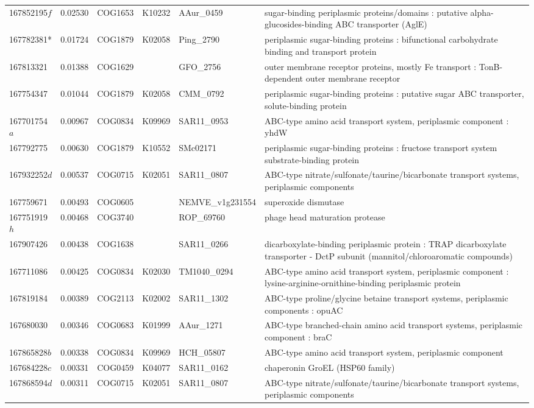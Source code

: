 \begin{landscape}
\begin{longtable}{p{1.6cm}p{1.2cm}p{1.5cm}p{1.5cm}p{2.8cm}p{13.5cm}}
167852195$f$&0.02530&COG1653&K10232&AAur\_0459&sugar-binding periplasmic proteins/domains : putative alpha-glucosides-binding ABC transporter (AglE) \\
167782381*&0.01724&COG1879&K02058&Ping\_2790&periplasmic sugar-binding proteins : bifunctional carbohydrate binding and transport protein \\
167813321&0.01388&COG1629&&GFO\_2756&outer membrane receptor proteins, mostly Fe transport : TonB-dependent outer membrane receptor \\
167754347&0.01044&COG1879&K02058&CMM\_0792&periplasmic sugar-binding proteins : putative sugar ABC transporter, solute-binding protein \\
167701754$a$&0.00967&COG0834&K09969&SAR11\_0953&ABC-type amino acid transport system, periplasmic component : yhdW \\
167792775&0.00630&COG1879&K10552&SMc02171&periplasmic sugar-binding proteins : fructose transport system substrate-binding protein \\
167932252$d$&0.00537&COG0715&K02051&SAR11\_0807&ABC-type nitrate/sulfonate/taurine/bicarbonate transport systems, periplasmic components \\
167759671&0.00493&COG0605&&NEMVE\_v1g231554&superoxide dismutase \\
167751919$h$&0.00468&COG3740&&ROP\_69760&phage head maturation protease \\
167907426&0.00438&COG1638&&SAR11\_0266&dicarboxylate-binding periplasmic protein : TRAP dicarboxylate transporter - DctP subunit (mannitol/chloroaromatic compounds) \\
167711086&0.00425&COG0834&K02030&TM1040\_0294&ABC-type amino acid transport system, periplasmic component : lysine-arginine-ornithine-binding periplasmic protein \\
167819184&0.00389&COG2113&K02002&SAR11\_1302&ABC-type proline/glycine betaine transport systems, periplasmic components : opuAC \\
167680030&0.00346&COG0683&K01999&AAur\_1271&ABC-type branched-chain amino acid transport systems, periplasmic component : braC \\
167865828$b$&0.00338&COG0834&K09969&HCH\_05807&ABC-type amino acid transport system, periplasmic component \\
167684228$c$&0.00331&COG0459&K04077&SAR11\_0162&chaperonin GroEL (HSP60 family) \\
167868594$d$&0.00311&COG0715&K02051&SAR11\_0807&ABC-type nitrate/sulfonate/taurine/bicarbonate transport systems, periplasmic components \\

\end{longtable}
\end{landscape}
